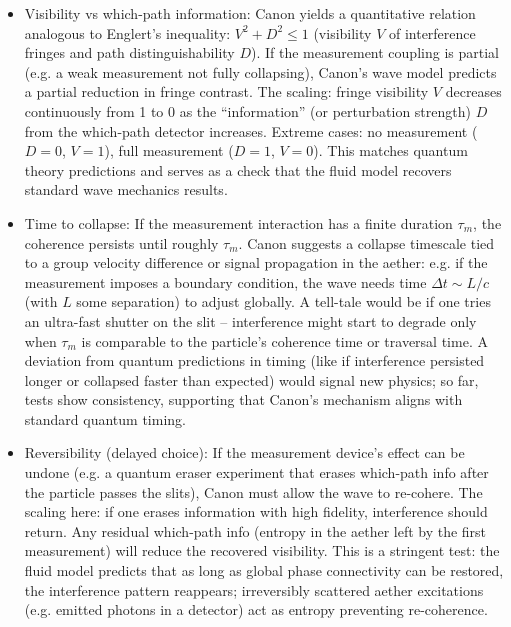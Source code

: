 \documentclass[11pt]{article}
\begin{document}
\begin{itemize}

\item 
Visibility vs which-path information: Canon yields a quantitative relation analogous to Englert’s inequality: $V^2 + D^2 \le 1$ (visibility $V$ of interference fringes and path distinguishability $D$). If the measurement coupling is partial (e.g. a weak measurement not fully collapsing), Canon’s wave model predicts a partial reduction in fringe contrast. The scaling: fringe visibility $V$ decreases continuously from 1 to 0 as the “information” (or perturbation strength) $D$ from the which-path detector increases. Extreme cases: no measurement ($D=0$, $V=1$), full measurement ($D=1$, $V=0$). This matches quantum theory predictions and serves as a check that the fluid model recovers standard wave mechanics results.




\item 
Time to collapse: If the measurement interaction has a finite duration $\tau_m$, the coherence persists until roughly $\tau_m$. Canon suggests a collapse timescale tied to a group velocity difference or signal propagation in the aether: e.g. if the measurement imposes a boundary condition, the wave needs time $\Delta t \sim L/c$ (with $L$ some separation) to adjust globally. A tell-tale would be if one tries an ultra-fast shutter on the slit – interference might start to degrade only when $\tau_m$ is comparable to the particle’s coherence time or traversal time. A deviation from quantum predictions in timing (like if interference persisted longer or collapsed faster than expected) would signal new physics; so far, tests show consistency, supporting that Canon’s mechanism aligns with standard quantum timing.




\item 
Reversibility (delayed choice): If the measurement device’s effect can be undone (e.g. a quantum eraser experiment that erases which-path info after the particle passes the slits), Canon must allow the wave to re-cohere. The scaling here: if one erases information with high fidelity, interference should return. Any residual which-path info (entropy in the aether left by the first measurement) will reduce the recovered visibility. This is a stringent test: the fluid model predicts that as long as global phase connectivity can be restored, the interference pattern reappears; irreversibly scattered aether excitations (e.g. emitted photons in a detector) act as entropy preventing re-coherence.




\end{itemize}
\end{document}
